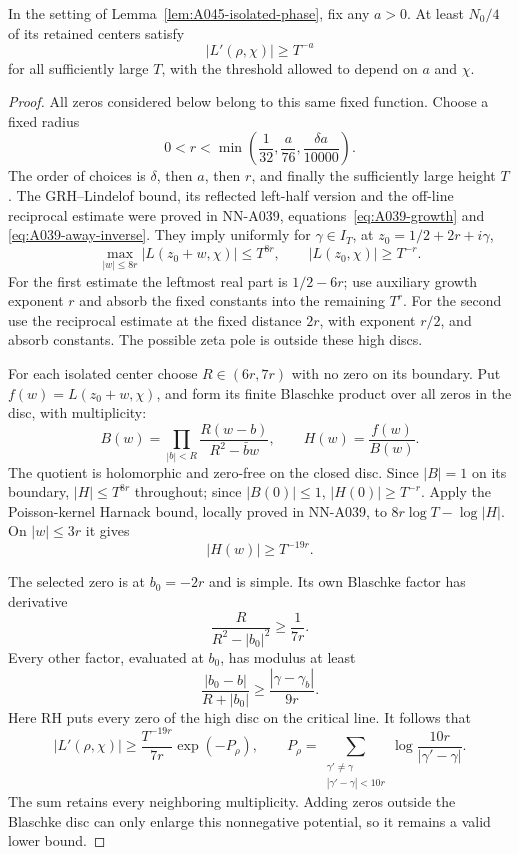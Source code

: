 \begin{lemma}
\label{lem:A045-isolated-derivative}
In the setting of Lemma~\ref{lem:A045-isolated-phase}, fix
any \(a>0\). At least \(N_0/4\) of its retained centers satisfy
\[
                          |L'(\rho,\chi)|\ge T^{-a}
\]
for all sufficiently large \(T\), with the threshold allowed
to depend on \(a\) and \(\chi\).
\end{lemma}

\begin{proof}
All zeros considered below belong to this same fixed function.
Choose a fixed radius
\[
 0<r<\min\left(\frac1{32},\frac a{76},
                               \frac{\delta a}{10000}\right).
\]
The order of choices is \(\delta\), then \(a\), then \(r\),
and finally the sufficiently large height \(T\).
The GRH--Lindelof bound, its reflected left-half version and
the off-line reciprocal estimate were proved in
NN-A039, equations~\eqref{eq:A039-growth} and
\eqref{eq:A039-away-inverse}. They imply uniformly for
\(\gamma\in I_T\), at \(z_0=1/2+2r+i\gamma\),
\[
 \max_{|w|\le8r}|L(z_0+w,\chi)|\le T^{8r},
                         \qquad |L(z_0,\chi)|\ge T^{-r}.
\]
For the first estimate the leftmost real part is
\(1/2-6r\); use auxiliary growth exponent \(r\) and absorb
the fixed constants into the remaining \(T^r\).
For the second use the reciprocal estimate at the fixed
distance \(2r\), with exponent \(r/2\), and absorb constants.
The possible zeta pole is outside these high discs.

For each isolated center choose \(R\in(6r,7r)\) with no zero
on its boundary. Put \(f(w)=L(z_0+w,\chi)\), and form its
finite Blaschke product over all zeros in the disc,
with multiplicity:
\[
 B(w)=\prod_{|b|<R}\frac{R(w-b)}{R^2-\bar b w},
                              \qquad H(w)=\frac{f(w)}{B(w)}.
\]
The quotient is holomorphic and zero-free on the closed
disc. Since \(|B|=1\) on its boundary,
\(|H|\le T^{8r}\) throughout; since \(|B(0)|\le1\),
\(|H(0)|\ge T^{-r}\).
Apply the Poisson-kernel Harnack bound, locally proved in
NN-A039, to \(8r\log T-\log|H|\). On \(|w|\le3r\)
it gives
\[
                              |H(w)|\ge T^{-19r}.
\]

The selected zero is at \(b_0=-2r\) and is simple. Its own
Blaschke factor has derivative
\[
                       \frac{R}{R^2-|b_0|^2}\ge\frac1{7r}.
\]
Every other factor, evaluated at \(b_0\), has modulus at least
\[
     \frac{|b_0-b|}{R+|b_0|}
            \ge\frac{|\gamma-\gamma_b|}{9r}.
\]
Here RH puts every zero of the high disc on the critical line.
It follows that
\begin{equation}\label{eq:A045-derivative-product}
 |L'(\rho,\chi)|\ge\frac{T^{-19r}}{7r}\exp(-P_\rho),
 \qquad
 P_\rho=\sum_{\substack{\gamma'\ne\gamma\\
                        |\gamma'-\gamma|<10r}}
                         \log\frac{10r}{|\gamma'-\gamma|}.
\end{equation}
The sum retains every neighboring multiplicity. Adding zeros
outside the Blaschke disc can only enlarge this nonnegative
potential, so it remains a valid lower bound.


\end{proof}
